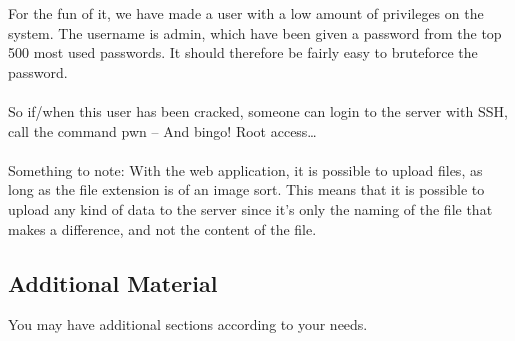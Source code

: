\documentclass{article}
\begin{document}
For the fun of it, we have made a user with a low amount of privileges on the system. The username is admin, which have been given a password from the top 500 most used passwords. It should therefore be fairly easy to bruteforce the password. \\ \\
So if/when this user has been cracked, someone can login to the server with SSH, call the command pwn – And bingo! Root access…\\ \\
Something to note:
With the web application, it is possible to upload files, as long as the file extension is of an image sort. This means that it is possible to upload any kind of data to the server since it’s only the naming of the file that makes a difference, and not the content of the file. 



\subsection{Additional Material}

You may have additional sections according to your needs.



\end{document}

